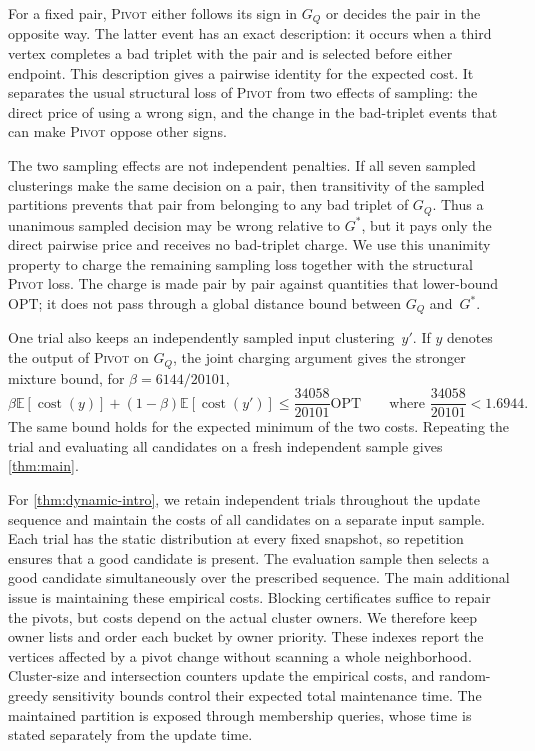 \documentclass[11pt,letterpaper]{article}
\theoremstyle{definition}
\theoremstyle{remark}
\newcommand{\OPT}{\mathrm{OPT}}
\newcommand{\cost}{\operatorname{cost}}
\newcommand{\E}{\mathbb{E}}
\newcommand{\1}{\mathbf{1}}
\newcommand{\Pivot}{\textnormal{\textsc{Pivot}}}
\begin{document}
For a fixed pair, \textsc{Pivot} either follows its sign in $G_Q$ or decides the pair in the opposite way.  The latter event has an exact description: it occurs when a third vertex completes a bad triplet with the pair and is selected before either endpoint.  This description gives a pairwise identity for the expected cost.  It separates the usual structural loss of \textsc{Pivot} from two effects of sampling: the direct price of using a wrong sign, and the change in the bad-triplet events that can make \textsc{Pivot} oppose other signs.

The two sampling effects are not independent penalties.  If all seven sampled clusterings make the same decision on a pair, then transitivity of the sampled partitions prevents that pair from belonging to any bad triplet of $G_Q$.  Thus a unanimous sampled decision may be wrong relative to $G^*$, but it pays only the direct pairwise price and receives no bad-triplet charge.  We use this unanimity property to charge the remaining sampling loss together with the structural \textsc{Pivot} loss.  The charge is made pair by pair against quantities that lower-bound~$\OPT$; it does not pass through a global distance bound between $G_Q$ and~$G^*$.

One trial also keeps an independently sampled input clustering~$y'$.  If $y$ denotes the output of \Pivot{} on $G_Q$, the joint charging argument gives the stronger mixture bound, for $\beta=6144/20101$,
\[
 \beta\E[\cost(y)]+(1-\beta)\E[\cost(y')]
 \le \frac{34058}{20101}\OPT
 \qquad\text{where }\frac{34058}{20101}<1.6944.
\]
The same bound holds for the expected minimum of the two costs.  Repeating the trial and evaluating all candidates on a fresh independent sample gives \cref{thm:main}.

For \cref{thm:dynamic-intro}, we retain independent trials throughout the update sequence and maintain the costs of all candidates on a separate input sample.  Each trial has the static distribution at every fixed snapshot, so repetition ensures that a good candidate is present.  The evaluation sample then selects a good candidate simultaneously over the prescribed sequence.  The main additional issue is maintaining these empirical costs.  Blocking certificates suffice to repair the pivots, but costs depend on the actual cluster owners.  We therefore keep owner lists and order each bucket by owner priority.  These indexes report the vertices affected by a pivot change without scanning a whole neighborhood.  Cluster-size and intersection counters update the empirical costs, and random-greedy sensitivity bounds control their expected total maintenance time.  The maintained partition is exposed through membership queries, whose time is stated separately from the update time.
\end{document}
